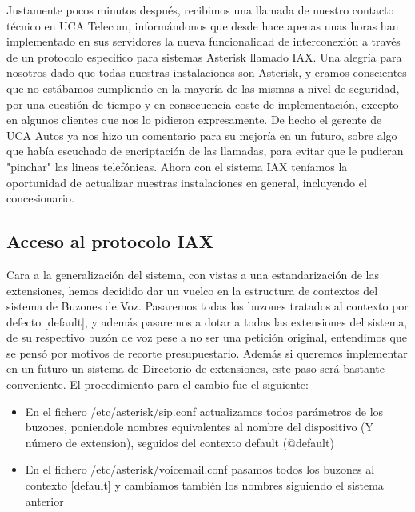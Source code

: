 Justamente pocos minutos después, recibimos una llamada de nuestro contacto técnico en UCA Telecom, informándonos que desde hace apenas unas horas han implementado en sus servidores la nueva funcionalidad de interconexión a través de un protocolo especifico para sistemas Asterisk llamado IAX. Una alegría para nosotros dado que todas nuestras instalaciones son Asterisk, y eramos conscientes que no estábamos cumpliendo en la mayoría de las mismas a nivel de seguridad, por una cuestión de tiempo y en consecuencia coste de implementación, excepto en algunos clientes que nos lo pidieron expresamente. De hecho el gerente de UCA Autos ya nos hizo un comentario para su mejoría en un futuro, sobre algo que había escuchado de encriptación de las llamadas, para evitar que le pudieran "pinchar" las lineas telefónicas. Ahora con el sistema IAX teníamos la oportunidad de actualizar nuestras instalaciones en general, incluyendo el concesionario.

\newpage

\color[rgb]{0,0,0}

\subsection{Acceso al protocolo IAX}

Cara a la generalización del sistema, con vistas a una estandarización de las extensiones, hemos decidido dar un vuelco en la estructura de contextos del sistema de Buzones de Voz. Pasaremos todas los buzones tratados al contexto por defecto [default], y además pasaremos a dotar a todas las extensiones del sistema, de su respectivo buzón de voz pese a no ser una petición original, entendimos que se pensó por motivos de recorte presupuestario. Además si queremos implementar en un futuro un sistema de Directorio de extensiones, este paso será bastante conveniente. El procedimiento para el cambio fue el siguiente:

\begin{itemize}

\item En el fichero /etc/asterisk/sip.conf actualizamos todos parámetros de los buzones, poniendole nombres equivalentes al nombre del dispositivo (Y número de extension), seguidos del contexto default (@default)
\item En el fichero /etc/asterisk/voicemail.conf pasamos todos los buzones al contexto [default] y cambiamos también los nombres siguiendo el sistema anterior

\end{itemize}

